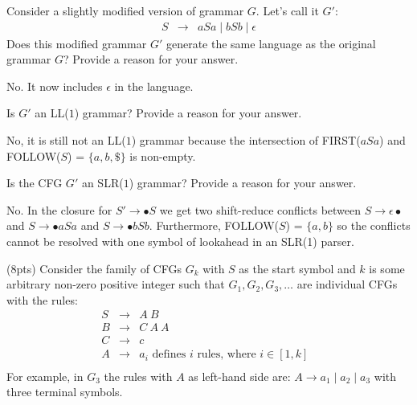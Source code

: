 \documentclass[11pt]{article}
\begin{document}
\begin{exe}
\begin{xlist}
    {\ex Consider a slightly modified version of grammar $G$. Let's
      call it $G'$:
      \begin{eqnarray}
        S & \rightarrow & aSa \mid bSb \mid \epsilon \nonumber
      \end{eqnarray}
      Does this modified grammar $G'$ generate the same language as
      the original grammar $G$? Provide a reason for your answer.
      \begin{soln}
        No. It now includes $\epsilon$ in the language.
      \end{soln}
    }
    
    {\ex  Is $G'$ an LL($1$) grammar? Provide a reason for your answer.
      \begin{soln}
        No, it is still not an LL($1$) grammar because the intersection
        of FIRST($aSa$) and FOLLOW($S$) = $\{ a, b, \$ \}$ is
        non-empty.
      \end{soln}
    }
    
    {\ex Is the CFG $G'$ an SLR($1$) grammar? Provide a reason for your
    answer.
      \begin{soln}
        No. In the closure for $S' \rightarrow \bullet S$ we get two
        shift-reduce conflicts between $S \rightarrow \epsilon \bullet$
        and $S \rightarrow \bullet aSa$ and $S \rightarrow \bullet bSb$.
        Furthermore, FOLLOW($S$) = $\{ a, b \}$ so the conflicts cannot
        be resolved with one symbol of lookahead in an SLR(1) parser.
      \end{soln}
    }


  \end{xlist}

\bigskip

\newcommand{\cfgrule}[2]{#1 & \rightarrow & #2 \nonumber \\}

\ex\label{derivs} (8pts) Consider the family of CFGs $G_k$ with $S$ as the start symbol and $k$ is some arbitrary non-zero positive integer such that $G_1, G_2, G_3, \ldots$ are individual CFGs with the rules:
\begin{eqnarray*}
\cfgrule{S}{A\ B}
\cfgrule{B}{C\ A\ A}
\cfgrule{C}{c}
\cfgrule{A}{a_i \textrm{\ \ \ defines $i$ rules, where $i \in [1,k]$ }}
\end{eqnarray*}
For example, in $G_3$ the rules with $A$ as left-hand side are: $A \rightarrow a_1 \mid a_2 \mid a_3$ with three terminal symbols.

\begin{xlist}


\end{xlist}
\end{exe}
\end{document}
